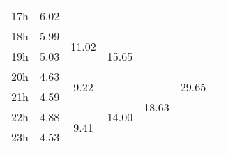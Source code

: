 \begin{center}
\begin{tabular}{l || c | c | c | c | c | c |}
17h & \multirow{1}{*}{ 6.02 }  & & & & & \\\cline{1-1}\cline{2-2}\cline{3-3}\cline{5-5}
18h & \multirow{1}{*}{ 5.99 }  & \multirow{2}{*}{ 11.02 }  & \multirow{3}{*}{ 15.65 }  & & \multirow{6}{*}{ 29.65 }  & \\\cline{1-1}
19h & \multirow{1}{*}{ 5.03 }  & & & & & \\\cline{1-1}\cline{2-2}\cline{4-4}
20h & \multirow{1}{*}{ 4.63 }  & \multirow{2}{*}{ 9.22 }  & & \multirow{4}{*}{ 18.63 }  & & \\\cline{1-1}\cline{3-3}
21h & \multirow{1}{*}{ 4.59 }  & & \multirow{3}{*}{ 14.00 }  & & & \\\cline{1-1}\cline{2-2}
22h & \multirow{1}{*}{ 4.88 }  & \multirow{2}{*}{ 9.41 }  & & & & \\\cline{1-1}
23h & \multirow{1}{*}{ 4.53 }  & & & & & \\\cline{1-1}\cline{2-2}\cline{3-3}\cline{4-4}\cline{5-5}\cline{6-6}
\end{tabular}
\end{center}